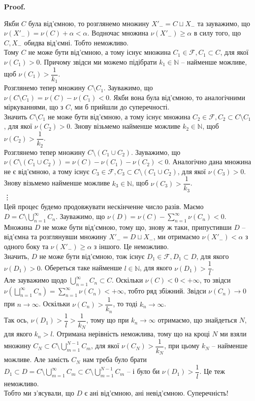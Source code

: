 \documentclass[a4paper, 10pt]{article}
\makeatletter
\theoremstyle{theoremdd}
\renewenvironment{proof}[1][Proof.\\]{\par
\pushQED{\hfill \qed}%
\normalfont \topsep6\p@\@plus6\p@\relax
\trivlist
\item\relax
{\bfseries
#1\@addpunct{.}}\hspace\labelsep\ignorespaces
}{%
\popQED\endtrivlist\@endpefalse
}
\makeatother
\begin{document}
\begin{proof}
Якби $C$ була від'ємною, то розглянемо множину $X'_{-} = C \sqcup X_-$ та зауважимо, що $\nu(X'_{-}) = \nu(C) + \alpha < \alpha$. Водночас множина $\nu(X'_{-}) \geq \alpha$ в силу того, що $C, X_-$ обидва від'ємні. Тобто неможливо.\\
Тому $C$ не може бути від'ємною, а тому існує множина $C_1 \in \mathcal{F}, C_1 \subset C$, для якої $\nu(C_1) > 0$. Причому звідси ми можемо підібрати $k_1 \in \mathbb{N}$ -- найменше можливе, щоб $\nu(C_1) > \dfrac{1}{k_1}$.\\
Розглянемо тепер множину $C \setminus C_1$. Зауважимо, що $\nu(C \setminus C_1) = \nu(C) - \nu(C_1) < 0$. Якби вона була від'ємною, то аналогічними міркуваннями, що з $C$, ми б прийшли до суперечності.\\
Значить $C \setminus C_1$ не може бути від'ємною, а тому існує множина $C_2 \in \mathcal{F}, C_2 \subset C \setminus C_1$, для якої $\nu(C_2) > 0$. Знову візьмемо найменше можливе $k_2 \in \mathbb{N}$, щоб $\nu(C_2) > \dfrac{1}{k_2}$.\\
Розглянемо тепер множину $C \setminus (C_1 \cup C_2)$. Зауважимо, що $\nu(C \setminus (C_1 \cup C_2)) = \nu(C) - \nu(C_1) - \nu(C_2) < 0$. Аналогічно дана множина не є від'ємною, а тому існує $C_3 \in \mathcal{F}, C_3 \subset C \setminus (C_1 \cup C_2)$, для якої $\nu(C_3) > 0$. Знову візьмемо найменше можливе $k_3 \in \mathbb{N}$, щоб $\nu(C_3) > \dfrac{1}{k_3}$.\\
\vdots \\
Цей процес будемо продовжувати нескінченне число разів. Маємо $D = \displaystyle C \setminus \bigcup_{n=1}^\infty C_n$. Зауважимо, що $\nu(D) = \nu(C) - \displaystyle\sum_{n=1}^\infty \nu(C_n) < 0$. Множина $D$ не може бути від'ємною, тому що, знову ж таки, припустивши $D$ -- від'ємна та розглянувши множину $X'_{-} = D \sqcup X_-$, ми отримаємо $\nu(X'_{-}) < \alpha$ з одного боку та $\nu(X'_{-}) \geq \alpha$ з іншого. Це неможливо.\\
Значить, $D$ не може бути від'ємною, тож існує $D_1 \in \mathcal{F}, D_1 \subset D$, для якого $\nu(D_1) > 0$. Обереться таке найменше $l \in \mathbb{N}$, для якого $\nu(D_1) > \dfrac{1}{l}$.\\
Але зауважимо щодо $\displaystyle\bigcup_{n=1}^\infty C_n \subset C$. Оскільки $\nu(C) < 0 < +\infty$, то звідси $\displaystyle\nu\left( \bigsqcup_{n=1}^\infty C_n \right) = \sum_{n=1}^\infty \nu(C_n) < +\infty$, тобто ряд збіжний. Звідси $\nu(C_n) \to 0$ при $n \to \infty$. Оскільки $\nu(C_n) > \dfrac{1}{k_n}$, то тоді $k_n \to \infty$.\\
Так ось, $\nu(D_1) > \dfrac{1}{l} > \dfrac{1}{k_N}$, тому що при $k_n \to \infty$ отримаємо, що знайдеться $N$, для якого $k_n > l$. Отримана нерівність неможлива, тому що на кроці $N$ ми взяли множину $C_N \subset C \setminus \displaystyle\bigcup_{m=1}^{N-1} C_m$, для якої $\nu(C_N) > \dfrac{1}{k_N}$, при цьому $k_N$ -- найменше можливе. Але замість $C_N$ нам треба було брати $D_1 \subset D = C \setminus \displaystyle\bigcup_{m=1}^\infty C_m \subset C \setminus \bigcup_{m=1}^{N-1} C_m$ -- і було би $\nu(D_1) > \dfrac{1}{l}$. Це теж неможливо.\\
Тобто ми з'ясували, що $D$ є ані від'ємною, ані невід'ємною. Суперечність!
\end{proof}
\end{document}
